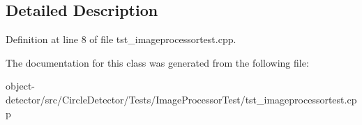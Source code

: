 \subsection{Detailed Description}


Definition at line 8 of file tst\+\_\+imageprocessortest.\+cpp.



The documentation for this class was generated from the following file\+:\begin{DoxyCompactItemize}
\item 
object-\/detector/src/\+Circle\+Detector/\+Tests/\+Image\+Processor\+Test/tst\+\_\+imageprocessortest.\+cpp\end{DoxyCompactItemize}
